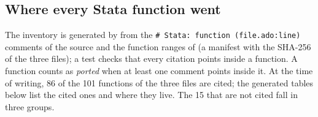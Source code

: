 \documentclass[
  10.5pt,
  a4paper,
]{article}
\begin{document}
\subsection{Where every Stata function went}\label{note:map}

The inventory is generated by  from the \texttt{\# Stata: function (file.ado:line)} comments of
the source and the function ranges of  (a manifest with the SHA-256 of the three
 files); a test checks that every citation points inside a function. A function counts as \emph{ported} when
at least one comment points inside it. At the time of writing, 86 of the 101 functions of the three files are cited; the generated
tables below list the cited ones and where they live. The 15 that are not cited fall in three groups.
\end{document}
